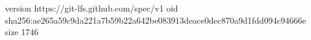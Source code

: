 version https://git-lfs.github.com/spec/v1
oid sha256:ae265a59c9da221a7b59b22a642be083913deace0dec870a9d1fdd094c94666e
size 1746
